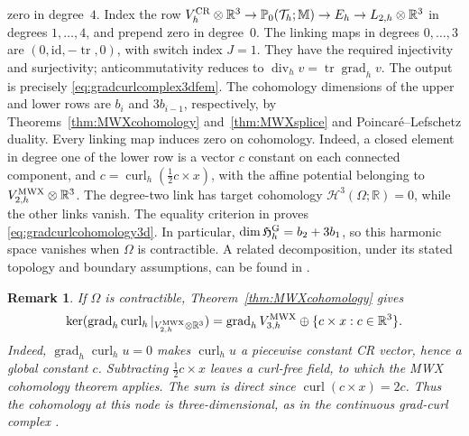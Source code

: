 \documentclass[10pt]{amsart}
\numberwithin{equation}{section}
\newtheorem{remark}[theorem]{Remark}
\newcommand{\curl}{\operatorname{curl}}
\renewcommand{\div}{\operatorname{div}}
\newcommand{\grad}{\operatorname{grad}}
\newcommand{\tr}{\operatorname{tr}}
\begin{document}
zero in degree~$4$. Index the row
$V_h^{\rm CR}\otimes\mathbb R^3\to\mathbb P_0(\mathcal T_h;\mathbb M)
\to E_h\to L_{2,h}\otimes\mathbb R^3$
in degrees $1,\ldots,4$, and prepend zero in degree~$0$.
The linking maps in degrees $0,\ldots,3$ are
$(0,\mathrm{id},-\tr,0)$, with switch index $J=1$.
They have the required injectivity and surjectivity; anticommutativity reduces
to $\div_h v=\tr\grad_h v$.
The output is precisely \eqref{eq:gradcurlcomplex3dfem}.
The cohomology dimensions of the upper and lower rows are $b_i$ and
$3b_{i-1}$, respectively, by Theorems~\ref{thm:MWXcohomology}
and~\ref{thm:MWXsplice} and Poincar\'e--Lefschetz duality.
Every linking map induces zero on cohomology. Indeed, a closed element
in degree one of the lower row is a vector $c$ constant on each connected
component, and $c=\curl_h(\tfrac12c\times x)$, with the affine potential
belonging to $V_{2,h}^{\rm MWX}\otimes\mathbb R^3$.
The degree-two link has target cohomology $\mathscr H^3(\Omega;\mathbb R)=0$,
while the other links vanish. The equality criterion in
\cite[Theorem 6]{ArnoldHu2021} proves \eqref{eq:gradcurlcohomology3d}.
In particular, $\dim\mathfrak H_h^{\rm G}=b_2+3b_1$, so this harmonic
space vanishes when $\Omega$ is contractible.
A related decomposition, under its stated topology and boundary assumptions,
can be found in \cite[Corollary 6.4]{BringmannKettelerSchedensack2025}.

\begin{remark}\rm
If $\Omega$ is contractible, Theorem~\ref{thm:MWXcohomology} gives
\[
\ker(\grad_h\curl_h|_{V_{2,h}^{\rm MWX}\otimes\mathbb R^3})
=\grad_h V_{3,h}^{\rm MWX}\oplus
\{c\times x:c\in\mathbb R^3\}.
\]
Indeed, $\grad_h\curl_h u=0$ makes $\curl_hu$ a piecewise constant CR
vector, hence a global constant $c$. Subtracting $\tfrac12c\times x$ leaves
a curl-free field, to which the MWX cohomology theorem applies.
The sum is direct since $\curl(c\times x)=2c$.
Thus the cohomology at this node is three-dimensional, as in the continuous
grad-curl complex \cite[(46)]{ArnoldHu2021}.
\end{remark}
\end{document}
